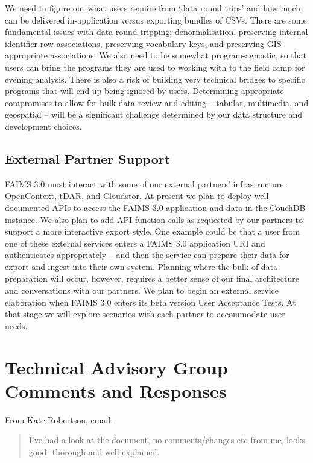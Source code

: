 \documentclass{faims3_report}
\begin{document}
We need to figure out what users require from `data round trips' and how
much can be delivered in-application versus exporting bundles of CSVs.
There are some fundamental issues with data round-tripping:
denormalisation, preserving internal identifier row-associations,
preserving vocabulary keys, and preserving GIS-appropriate associations.
We also need to be somewhat program-agnostic, so that users can bring
the programs they are used to working with to the field camp for evening
analysis. There is also a risk of building very technical bridges to
specific programs that will end up being ignored by users. Determining
appropriate compromises to allow for bulk data review and editing --
tabular, multimedia, and geospatial -- will be a significant challenge
determined by our data structure and development choices.

\section{External Partner Support}

FAIMS 3.0 must interact with some of our external partners'
infrastructure: OpenContext, tDAR, and Cloudstor. At present we plan to
deploy well documented APIs to access the FAIMS 3.0 application and data
in the CouchDB instance. We also plan to add API function calls as
requested by our partners to support a more interactive export style.
One example could be that a user from one of these external services
enters a FAIMS 3.0 application URI and authenticates appropriately --
and then the service can prepare their data for export and ingest into
their own system. Planning where the bulk of data preparation will
occur, however, requires a better sense of our final architecture and
conversations with our partners. We plan to begin an external service
elaboration when FAIMS 3.0 enters its beta version User Acceptance
Tests. At that stage we will explore scenarios with each partner to
accommodate user needs.

\printbibliography


\chapter{Technical Advisory Group
Comments and Responses}

From Kate Robertson, email:
\begin{quote}
I've had a look at the document, no comments/changes etc from me, looks
good- thorough and well explained.
\end{quote}
\end{document}
